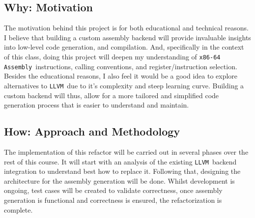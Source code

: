 \documentclass[11pt]{article}
\newcommand{\llvm}{\texttt{LLVM}}
\newcommand{\asm}{\texttt{x86-64 Assembly}}
\begin{document}
\subsection{Why: Motivation}
\label{subsec:why}

The motivation behind this project is for both educational and technical reasons.
I believe that building a custom assembly backend will provide invaluable insights into low-level code generation, and compilation.
And, specifically in the context of this class, doing this project will deepen my understanding of \asm\ instructions, calling conventions, and register/instruction selection.
Besides the educational reasons, I also feel it would be a good idea to explore alternatives to \llvm\ due to it's complexity and steep learning curve.
Building a custom backend will thus, allow for a more tailored and simplified code generation process that is easier to understand and maintain.

\subsection{How: Approach and Methodology}
\label{subsec:how}

The implementation of this refactor will be carried out in several phases over the rest of this course.
It will start with an analysis of the existing \llvm\ backend integration to understand best how to replace it.
Following that, designing the architecture for the assembly generation will be done.
Whilst development is ongoing, test cases will be created to validate correctness, once assembly generation is functional and correctness is ensured, the refactorization is complete.
\end{document}
